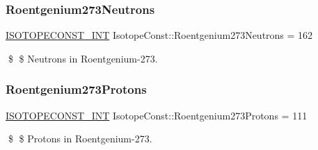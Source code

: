 \subsubsection{\texorpdfstring{Roentgenium273\+Neutrons}{Roentgenium273Neutrons}}
{\footnotesize\ttfamily \mbox{\hyperlink{group___isotope_const-_macros_ga5f18360b3e99483a35c32d789e62621c}{I\+S\+O\+T\+O\+P\+E\+C\+O\+N\+S\+T\+\_\+\+I\+NT}} Isotope\+Const\+::\+Roentgenium273\+Neutrons = 162}

\$ \$ Neutrons in Roentgenium-\/273. \mbox{\label{group___isotope_const-_roentgenium-_rg273_gad20011ec4b5f5326aeabfcec79ca57fd}} 
\subsubsection{\texorpdfstring{Roentgenium273\+Protons}{Roentgenium273Protons}}
{\footnotesize\ttfamily \mbox{\hyperlink{group___isotope_const-_macros_ga5f18360b3e99483a35c32d789e62621c}{I\+S\+O\+T\+O\+P\+E\+C\+O\+N\+S\+T\+\_\+\+I\+NT}} Isotope\+Const\+::\+Roentgenium273\+Protons = 111}

\$ \$ Protons in Roentgenium-\/273. 